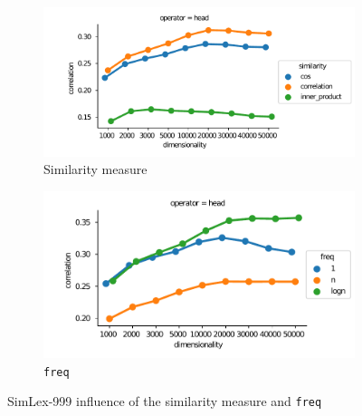 \begin{figure}[b]
  \centering

  \begin{subfigure}[t]{0.49\textwidth}
    \hspace{-20pt}
  \includegraphics[width=1.1\textwidth]{supplement/figures/SimLex999-interaction-similarity}

  \caption{Similarity measure}
  \label{fig:SimLex999-similarity}

  \end{subfigure}
  \begin{subfigure}[t]{0.49\textwidth}

  \includegraphics[width=\textwidth]{supplement/figures/SimLex999-interaction-freq}

  \caption{\texttt{freq}}
  \label{fig:SimLex999-freq}

  \end{subfigure}

  \caption{SimLex-999 influence of the similarity measure and \texttt{freq}}
\end{figure}
